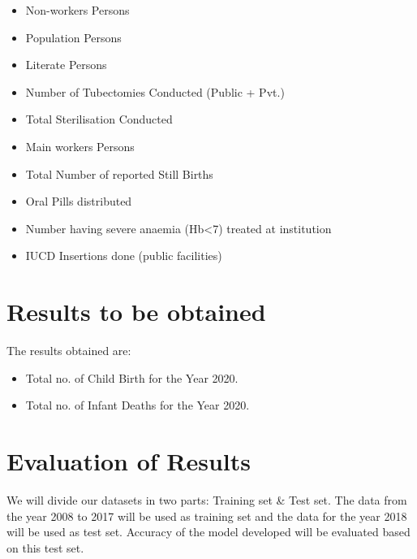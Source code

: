 \documentclass[]{article}
\begin{document}
\medskip

\begin{minipage}[t]{0.5\textwidth}
\begin{itemize}
\item Non-workers Persons
\item Population Persons
\item Literate Persons
\item Number of Tubectomies Conducted (Public + Pvt.)
\item Total Sterilisation Conducted
\end{itemize}
\end{minipage}
\begin{minipage}[t]{0.5\textwidth}
\begin{itemize}
\item Main workers Persons
\item Total Number of reported Still Births
\item Oral Pills distributed
\item Number having severe anaemia (Hb<7) treated at institution
\item IUCD Insertions done (public facilities)
\end{itemize}
\end{minipage}

\newpage

\section{Results to be obtained}
The results obtained are:
\begin{itemize}
\item Total no. of Child Birth for the Year 2020.
\item Total no. of Infant Deaths for the Year 2020.
\end{itemize}

\section{Evaluation of Results}
We will divide our datasets in two parts: Training set \& Test set. The data from the year 2008 to 2017 will be used as training set and the data for the year 2018 will be used as test set. Accuracy of the model developed will be evaluated based on this test set. \\
\end{document}
